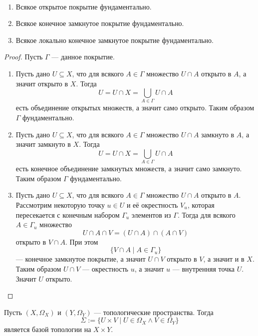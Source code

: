 \documentclass[12pt,a4paper]{article}
\begin{document}
    \begin{theorem}\ 
        \begin{enumerate}
            \item Всякое открытое покрытие фундаментально.
            \item Всякое конечное замкнутое покрытие фундаментально.
            \item Всякое локально конечное замкнутое покрытие фундаментально.
        \end{enumerate}
    \end{theorem}

    \begin{proof}
        Пусть $\Gamma$ --- данное покрытие.
        \begin{enumerate}
            \item Пусть дано $U \subseteq X$, что для всякого $A \in \Gamma$ множество $U \cap A$ открыто в $A$, а значит открыто в $X$. Тогда
                \[U = U \cap X = \bigcup_{A \in \Gamma} U \cap A\]
                есть объединение открытых множеств, а значит само открыто. Таким образом $\Gamma$ фундаментально.

            \item Пусть дано $U \subseteq X$, что для всякого $A \in \Gamma$ множество $U \cap A$ замкнуто в $A$, а значит замкнуто в $X$. Тогда
                \[U = U \cap X = \bigcup_{A \in \Gamma} U \cap A\]
                есть конечное объединение замкнутых множеств, а значит само замкнуто. Таким образом $\Gamma$ фундаментально.

            \item Пусть дано $U \subseteq X$, что для всякого $A \in \Gamma$ множество $U \cap A$ открыто в $A$. Рассмотрим некоторую точку $u \in U$ и её окрестность $V_u$, которая пересекается с конечным набором $\Gamma_u$ элементов из $\Gamma$. Тогда для всякого $A \in \Gamma_u$ множество
                \[U \cap A \cap V = (U \cap A) \cap (A \cap V)\]
                открыто в $V \cap A$. При этом
                \[\{V \cap A \mid A \in \Gamma_u\}\]
                --- конечное замкнутое покрытие, а значит $U \cap V$ открыто в $V$, а значит и в $X$. Таким образом $U \cap V$ --- окрестность $u$, а значит $u$ --- внутренняя точка $U$. Значит $U$ открыто.
        \end{enumerate}
    \end{proof}

    \begin{theorem}
        Пусть $(X, \Omega_X)$ и $(Y, \Omega_Y)$ --- топологические пространства. Тогда
        \[\Sigma := \{U \times V \mid U \in \Omega_X \wedge V \in \Omega_Y\}\]
        является базой топологии на $X \times Y$.
    \end{theorem}
\end{document}
